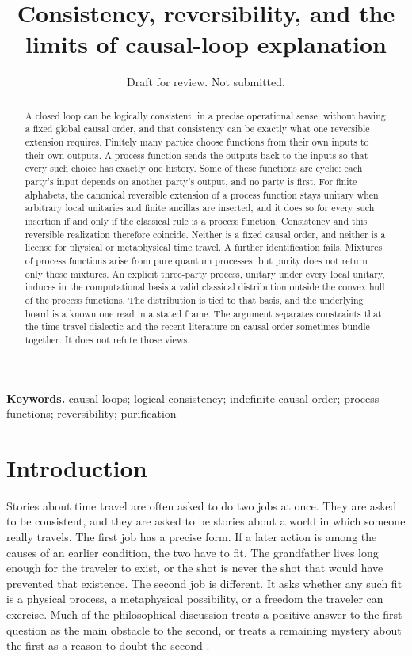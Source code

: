 \documentclass[11pt]{article}
\title{Consistency, reversibility, and the limits of causal-loop explanation}
\author{}
\date{Draft for review. Not submitted.}
\begin{document}
\maketitle

\begin{abstract}
A closed loop can be logically consistent, in a precise operational sense, without having a fixed global causal order, and that consistency can be exactly what one reversible extension requires. Finitely many parties choose functions from their own inputs to their own outputs. A process function sends the outputs back to the inputs so that every such choice has exactly one history. Some of these functions are cyclic: each party's input depends on another party's output, and no party is first. For finite alphabets, the canonical reversible extension of a process function stays unitary when arbitrary local unitaries and finite ancillas are inserted, and it does so for every such insertion if and only if the classical rule is a process function. Consistency and this reversible realization therefore coincide. Neither is a fixed causal order, and neither is a license for physical or metaphysical time travel. A further identification fails. Mixtures of process functions arise from pure quantum processes, but purity does not return only those mixtures. An explicit three-party process, unitary under every local unitary, induces in the computational basis a valid classical distribution outside the convex hull of the process functions. The distribution is tied to that basis, and the underlying board is a known one read in a stated frame. The argument separates constraints that the time-travel dialectic and the recent literature on causal order sometimes bundle together. It does not refute those views.
\end{abstract}

\noindent\textbf{Keywords.} causal loops; logical consistency; indefinite causal order; process functions; reversibility; purification

\section{Introduction}
\label{sec:intro}

Stories about time travel are often asked to do two jobs at once. They are asked to be consistent, and they are asked to be stories about a world in which someone really travels. The first job has a precise form. If a later action is among the causes of an earlier condition, the two have to fit. The grandfather lives long enough for the traveler to exist, or the shot is never the shot that would have prevented that existence. The second job is different. It asks whether any such fit is a physical process, a metaphysical possibility, or a freedom the traveler can exercise. Much of the philosophical discussion treats a positive answer to the first question as the main obstacle to the second, or treats a remaining mystery about the first as a reason to doubt the second \citep{lewis1976,loewenstein2022}.
\end{document}
